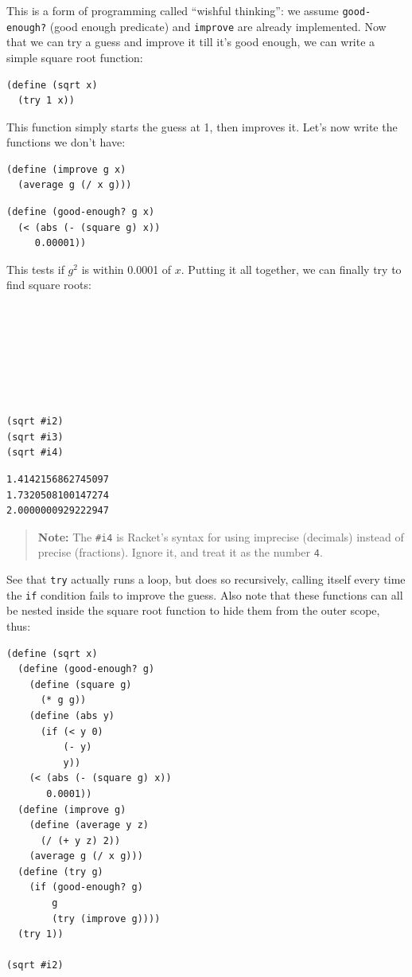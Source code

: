\documentclass[9pt]{report}
\begin{document}
This is a form of programming called ``wishful thinking'': we assume
\texttt{good-enough?} (good enough predicate) and \texttt{improve} are already
implemented. Now that we can try a guess and improve it till it's
good enough, we can write a simple square root function:

\begin{verbatim}
(define (sqrt x)
  (try 1 x))
\end{verbatim}

This function simply starts the guess at 1, then improves it. Let's
now write the functions we don't have:

\begin{verbatim}
(define (improve g x)
  (average g (/ x g)))
\end{verbatim}

\begin{verbatim}
(define (good-enough? g x)
  (< (abs (- (square g) x))
     0.00001))
\end{verbatim}

This tests if \(g^2\) is within 0.0001 of \(x\). Putting it all
together, we can finally try to find square roots:

\begin{verbatim}







(sqrt #i2)
(sqrt #i3)
(sqrt #i4)
\end{verbatim}

\begin{verbatim}
1.4142156862745097
1.7320508100147274
2.0000000929222947
\end{verbatim}


\begin{quote}
\textbf{Note:} The \texttt{\#i4} is Racket's syntax for using imprecise
(decimals) instead of precise (fractions). Ignore it, and treat it
as the number \texttt{4}.
\end{quote}

See that \texttt{try} actually runs a loop, but does so recursively,
calling itself every time the \texttt{if} condition fails to improve the
guess. Also note that these functions can all be nested inside the
square root function to hide them from the outer scope, thus:

\begin{verbatim}
(define (sqrt x)
  (define (good-enough? g)
    (define (square g)
      (* g g))
    (define (abs y)
      (if (< y 0)
          (- y)
          y))
    (< (abs (- (square g) x))
       0.0001))
  (define (improve g)
    (define (average y z)
      (/ (+ y z) 2))
    (average g (/ x g)))
  (define (try g)
    (if (good-enough? g)
        g
        (try (improve g))))
  (try 1))

(sqrt #i2)
\end{verbatim}
\end{document}
